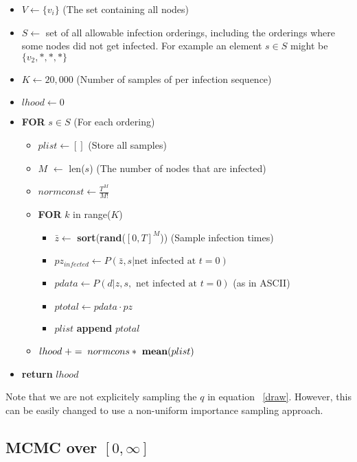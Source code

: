 \documentclass{article}
\begin{document}
\begin{itemize}
\item $V \leftarrow \{v_i\}$    (The set containing all nodes)
\item  $ S\leftarrow$ set of all allowable infection orderings, including the orderings where some nodes did not get infected.  For example an element $s \in S$ might be $\{v_2, *, *,*\}$
\item $K \leftarrow 20,000$  (Number of samples of per infection sequence)
\item $lhood \leftarrow 0$
\item \textbf{FOR} $s \in S$           (For each ordering)
\begin{itemize}
\item $plist \leftarrow []$ (Store all samples)
\item $M$ $\leftarrow$ len($s$)  (The number of nodes that are infected)
\item $normconst \leftarrow \frac{T^M}{M!}$
\item \textbf{FOR} $k$ in range($K$)
\begin{itemize}
\item $\bar{z} \leftarrow$ \textbf{sort}(\textbf{rand}($[0,T]^M$))  (Sample infection times)
\item $pz_{infected} \leftarrow P(\bar{z}, s | \text{net infected at } t=0)$ 
\item $pdata \leftarrow P(d | z,s, \text{ net infected at } t=0)$ (as in ASCII)
\item $ptotal \leftarrow  pdata \cdot pz$
\item $plist$ \textbf{append}  $ptotal$
\end{itemize}
\item $ lhood \; += \; normcons * \text{ \textbf{mean}}(plist)$
\end{itemize}
\item \textbf{return} $lhood$
\end{itemize}

Note that we are not explicitely sampling the $q$ in equation ~\ref{draw}. However, this can be easily changed to 
use a non-uniform importance sampling approach.

\pagebreak

\subsection{MCMC over $[0, \infty]$}
\end{document}
